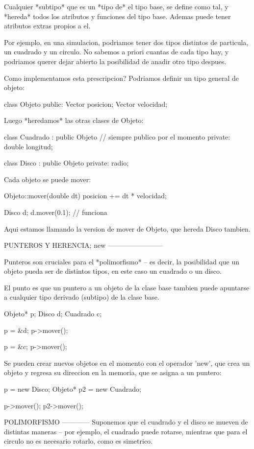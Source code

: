 Cualquier *subtipo* que es un *tipo de* el tipo base, se define como tal, y *hereda* todos los atributos y funciones del tipo base.
Ademas puede tener atributos extras propios a el.

Por ejemplo, en una simulacion, podriamos tener dos tipos distintos de particula, un cuadrado y un circulo.  No sabemos a priori cuantas de cada tipo hay, y podriamos querer dejar abierto la posibilidad de anadir otro tipo despues.


Como implementamos esta prescripcion?
Podriamos definir un tipo general de objeto:

class Objeto {
	public:
	Vector posicion;
	Vector velocidad;
}

Luego *heredamos* las otras clases de Objeto:

class Cuadrado : public Objeto {   // siempre publico por el momento
	private:
	double longitud;
}

class Disco : public Objeto {
	private:
	radio;
}


Cada objeto se puede mover:

Objeto::mover(double dt) {
	posicion += dt * velocidad;
}

Disco d;
d.mover(0.1);   // funciona

Aqui estamos llamando la version de mover de Objeto, que hereda Disco tambien.


PUNTEROS Y HERENCIA; new
------------------------

Punteros son cruciales para el *polimorfismo* -- es decir, la posibilidad que un objeto pueda ser de distintos tipos, en este caso un cuadrado o un disco.

El punto es que un puntero a un objeto de la clase base tambien puede apuntarse a cualquier tipo derivado (subtipo) de la clase base.


Objeto* p;
Disco d;
Cuadrado c;

p = &d;
p->mover();

p = &c;
p->mover();

Se pueden crear nuevos objetos en el momento con el operador 'new', que crea un objeto y regresa su direccion en la memoria, que se asigna a un puntero:

p = new Disco;
Objeto* p2 = new Cuadrado;

p->mover();
p2->mover();


POLIMORFISMO
------------
Suponemos que el cuadrado y el disco se mueven de distintas maneras -- por ejemplo, el cuadrado puede rotarse, mientras que para el circulo no es necesario rotarlo, como es simetrico.

